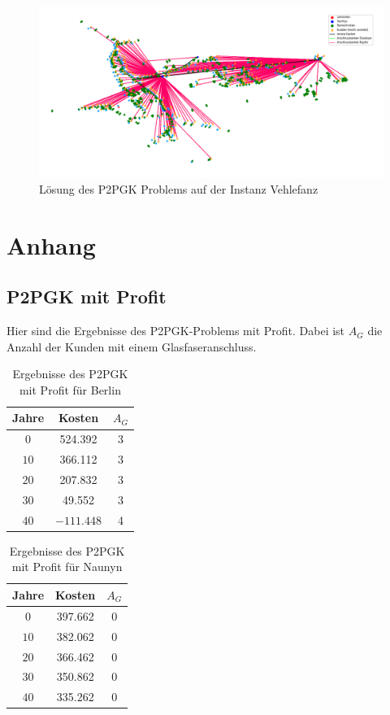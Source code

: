 \documentclass[11pt,a4paper]{article}
\theoremstyle{my_th_style1}
\begin{document}
\begin{figure}[ht]\label{p2pgk_v_pic}
	\begin{center}
		\begin{minipage}{15.0cm}
			\includegraphics[width=1\textwidth]{./Bilder/P2PGK_Vehlefanz_demand1_duration0}
			\caption{Lösung des P2PGK Problems auf der Instanz Vehlefanz}
		\end{minipage}
	\end{center}
\end{figure}

\newpage
\section*{Anhang}

\subsection*{P2PGK mit Profit}
Hier sind die Ergebnisse des P2PGK-Problems mit Profit. Dabei ist $A_G$ die Anzahl der Kunden mit einem Glasfaseranschluss.
\begin{table}[h]
	\centering
	\begin{tabular}{c|c|c}
		\centering
		Jahre & Kosten & $A_G$ \\	
		\hline
		$0$   	 &  524.392 & 3  \\
		$10$ 	&   366.112& 3  \\
		$20$   	&   207.832 & 3  \\
		$30$    &   49.552 & 3  \\
		$40$    & $-111.448$ & 4 \\
	\end{tabular}
	\label{P2PGKProfit}
	\caption{Ergebnisse des P2PGK mit Profit f\"ur Berlin} 
\end{table}

\begin{table}[h]
	\centering
	\begin{tabular}{c|c|c}
		\centering
		Jahre & Kosten & $A_G$ \\	
		\hline
		$0$   	 &  397.662& 0  \\
		$10$ 	&  382.062 & 0  \\
		$20$   	&  366.462  & 0  \\
		$30$    &  350.862 & 0  \\
		$40$    &  335.262  & 0 \\
	\end{tabular}
	\label{P2PGKProfitN}
	\caption{Ergebnisse des P2PGK mit Profit f\"ur Naunyn} 
\end{table}
\end{document}
